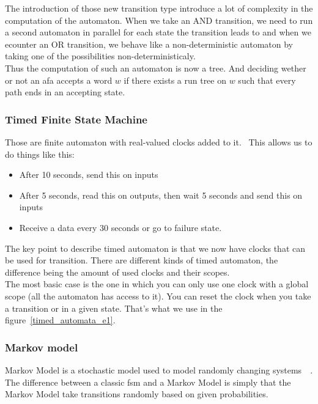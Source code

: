 \documentclass[12pt]{article}
\begin{document}
The introduction of those new transition type introduce a lot of complexity in the computation of the automaton. When we take an AND transition, we need to run a second automaton in parallel for each state the transition leads to and when we ecounter an OR transition, we behave like a non-deterministic automaton by taking one of the possibilities non-deterministicaly.\\

Thus the computation of such an automaton is now a tree. And deciding wether or not an \gls{afa} accepts a word $w$ if there exists a run tree on $w$ such that every path ends in an accepting state.~\cite{AFA:2017}\\

\subsubsection{Timed Finite State Machine}

Those are finite automaton with real-valued clocks added to it.~\cite{TimedAutomaton:2016} This allows us to do things like this:

\begin{itemize}
\item After 10 seconds, send this on inputs
\item After 5 seconds, read this on outputs, then wait 5 seconds and send this on inputs
\item Receive a data every 30 seconds or go to failure state.
\end{itemize}

The key point to describe timed automaton is that we now have clocks that can be used for transition. There are different kinds of timed automaton, the difference being the amount of used clocks and their scopes.\\

The most basic case is the one in which you can only use one clock with a global scope (all the automaton has access to it). You can reset the clock when you take a transition or in a given state. That's what we use in the figure~\ref{timed_automata_e1}.\\

\subsubsection{Markov model}

Markov Model is a stochastic model used to model randomly changing systems~\cite{1165342}~\cite{MarkovModel:2017}. The difference between a classic \gls{fsm} and a Markov Model is simply that the Markov Model take transitions randomly based on given probabilities.\\
\end{document}
